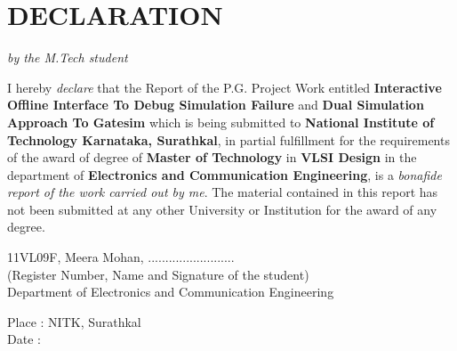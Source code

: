 \section*{\centering DECLARATION}
\begin{center}
 \emph{by the M.Tech student}
\end{center}
I hereby \emph{declare} that the Report of the P.G. Project Work entitled 
{\bf Interactive Offline Interface To Debug Simulation Failure} and {\bf  Dual Simulation Approach To Gatesim}
which is being submitted to {\bf National Institute of Technology Karnataka, Surathkal}, 
in partial fulfillment for 
the requirements of the award of degree of {\bf Master of Technology} 
in {\bf VLSI Design} in the department of {\bf Electronics and Communication Engineering}, 
is a \emph{bonafide report of the work carried out by me}. The material contained 
in this report has not been submitted at any other University or Institution 
for the award of any degree.

\vspace{1.2in}
\begin{flushright}
 11VL09F, Meera Mohan, .........................\\
 (Register Number, Name and Signature of the student)\\
\vspace{1cm}
Department of Electronics and Communication Engineering
\end{flushright}

\vspace{0.2in}
\begin{flushleft}
 Place : NITK, Surathkal\\
 Date  :
\end{flushleft}

